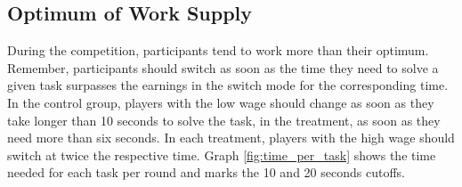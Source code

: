 \begin{table}[!htbp] \centering 
  \caption{Linear Mixed Model - Net Income} 
  \label{table:earnings_lmer}
\end{table} 


\subsection{Optimum of Work Supply}
During the competition, participants tend to work more than their optimum. Remember, participants should switch as soon as the time they need to solve a given task surpasses the earnings in the switch mode for the corresponding time. In the control group, players with the low wage should change as soon as they take longer than 10 seconds to solve the task, in the treatment, as soon as they need more than six seconds. In each treatment, players with the high wage should switch at twice the respective time. Graph \ref{fig:time_per_task} shows the time needed for each task per round and marks the 10 and 20 seconds cutoffs.\\

